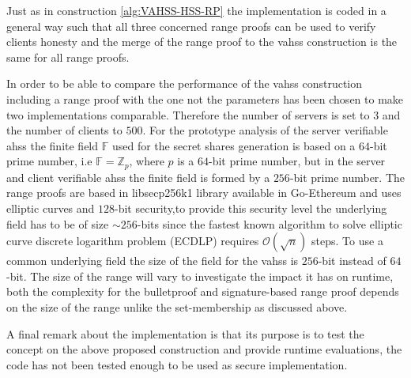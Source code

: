 Just as in construction \ref{alg:VAHSS-HSS-RP} the implementation is coded in a general way such that all three concerned range proofs can be used to verify clients honesty and the merge of the range proof to the vahss construction is the same for all range proofs. 

In order to be able to compare the performance of the vahss construction including a range proof with the one not the parameters has been chosen to make two implementations comparable. Therefore the number of servers is set to $3$ and the number of clients to $500$.  For the prototype analysis of the server verifiable ahss the finite field $\mathds{F}$ used for the secret shares generation is based on a $64$-bit prime number, i.e $\mathds{F}=\mathds{Z}_p$, where $p$ is a $64$-bit prime number,  but in the server and client verifiable ahss the finite field is formed by a $256$-bit prime number.  The range proofs are based in libsecp256k1 library available in Go-Ethereum and uses elliptic curves and $128$-bit security,to provide this security level the underlying field has to be of size $\sim 256$-bits since the fastest known algorithm to solve elliptic curve discrete logarithm problem (ECDLP) requires $\mathcal{O}(\sqrt{n})$ steps. To use a common underlying field the size of the field for the vahss is $256$-bit instead of $64$-bit.
The size of the range will vary to investigate the impact it has on runtime, both the complexity for the bulletproof and signature-based range proof depends on the size of the range  unlike the set-membership as discussed above. 

A final remark about the implementation is that its purpose is to test the concept on the above proposed construction and provide runtime evaluations, the code has not been tested enough to be used as secure implementation.




